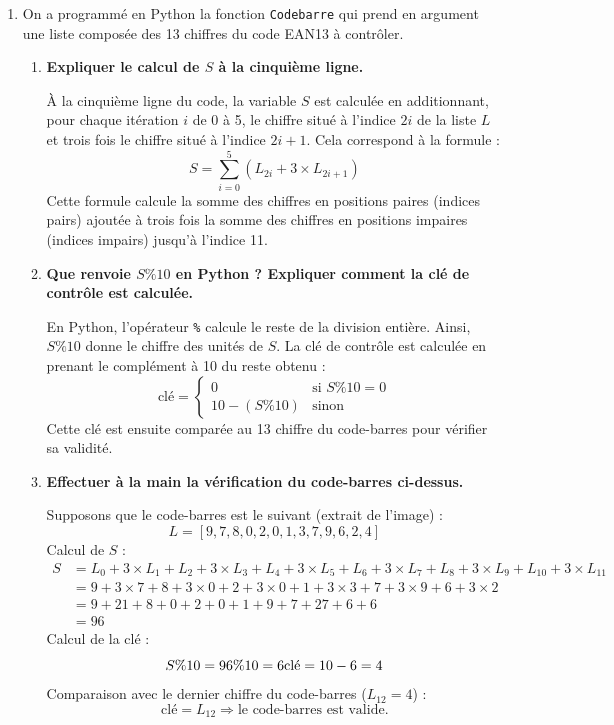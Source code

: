\documentclass{article}
\begin{document}
\begin{enumerate}
    \item On a programmé en Python la fonction \texttt{Codebarre} qui prend en argument une liste composée des 13 chiffres du code EAN13 à contrôler.
    \begin{enumerate}
        \item \textbf{Expliquer le calcul de $S$ à la cinquième ligne.}

        À la cinquième ligne du code, la variable $S$ est calculée en additionnant, pour chaque itération $i$ de 0 à 5, le chiffre situé à l'indice $2i$ de la liste $L$ et trois fois le chiffre situé à l'indice $2i + 1$. Cela correspond à la formule :
        \[
        S = \sum_{i=0}^{5} \left( L_{2i} + 3 \times L_{2i+1} \right)
        \]
        Cette formule calcule la somme des chiffres en positions paires (indices pairs) ajoutée à trois fois la somme des chiffres en positions impaires (indices impairs) jusqu'à l'indice 11.

        \item \textbf{Que renvoie $S \% 10$ en Python ? Expliquer comment la clé de contrôle est calculée.}

        En Python, l'opérateur \texttt{\%} calcule le reste de la division entière. Ainsi, $S \% 10$ donne le chiffre des unités de $S$. La clé de contrôle est calculée en prenant le complément à 10 du reste obtenu :
        \[
        \text{clé} = \begin{cases}
            0 & \text{si } S \% 10 = 0 \\
            10 - (S \% 10) & \text{sinon}
        \end{cases}
        \]
        Cette clé est ensuite comparée au 13 chiffre du code-barres pour vérifier sa validité.

        \item \textbf{Effectuer à la main la vérification du code-barres ci-dessus.}

        Supposons que le code-barres est le suivant (extrait de l'image) :
        \[
        L = [9, 7, 8, 0, 2, 0, 1, 3, 7, 9, 6, 2, 4]
        \]
        Calcul de $S$ :
        \begin{align*}
        S &= L_0 + 3 \times L_1 + L_2 + 3 \times L_3 + L_4 + 3 \times L_5 + L_6 + 3 \times L_7 + L_8 + 3 \times L_9 + L_{10} + 3 \times L_{11} \\
        &= 9 + 3 \times 7 + 8 + 3 \times 0 + 2 + 3 \times 0 + 1 + 3 \times 3 + 7 + 3 \times 9 + 6 + 3 \times 2 \\
        &= 9 + 21 + 8 + 0 + 2 + 0 + 1 + 9 + 7 + 27 + 6 + 6 \\
        &= 96
        \end{align*}
        Calcul de la clé :
        \[
        S \% 10 = 96 \% 10 = 6 \\
        \text{clé} = 10 - 6 = 4
        \]
        Comparaison avec le dernier chiffre du code-barres ($L_{12} = 4$) :
        \[
        \text{clé} = L_{12} \Rightarrow \text{le code-barres est valide.}
        \]


\end{enumerate}
\end{enumerate}
\end{document}
